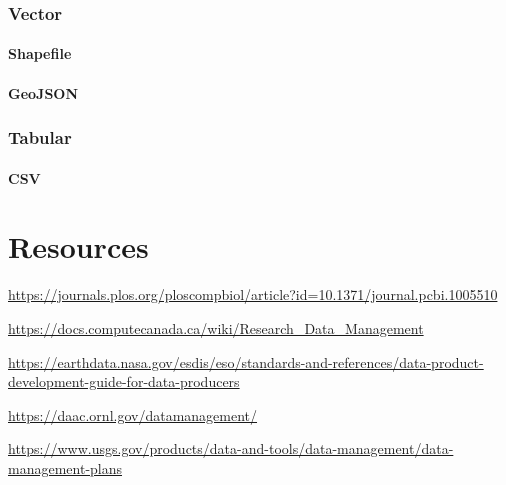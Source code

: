 \documentclass[
]{book}
\begin{document}
\hypertarget{vector}{%
\subsection{Vector}\label{vector}}

\hypertarget{shapefile}{%
\subsubsection{Shapefile}\label{shapefile}}

\hypertarget{geojson}{%
\subsubsection{GeoJSON}\label{geojson}}

\hypertarget{tabular}{%
\subsection{Tabular}\label{tabular}}

\hypertarget{csv}{%
\subsubsection{CSV}\label{csv}}

\hypertarget{resources}{%
\chapter{Resources}\label{resources}}

\url{https://journals.plos.org/ploscompbiol/article?id=10.1371/journal.pcbi.1005510}

\url{https://docs.computecanada.ca/wiki/Research_Data_Management}

\url{https://earthdata.nasa.gov/esdis/eso/standards-and-references/data-product-development-guide-for-data-producers}

\url{https://daac.ornl.gov/datamanagement/}

\url{https://www.usgs.gov/products/data-and-tools/data-management/data-management-plans}

  
\end{document}
